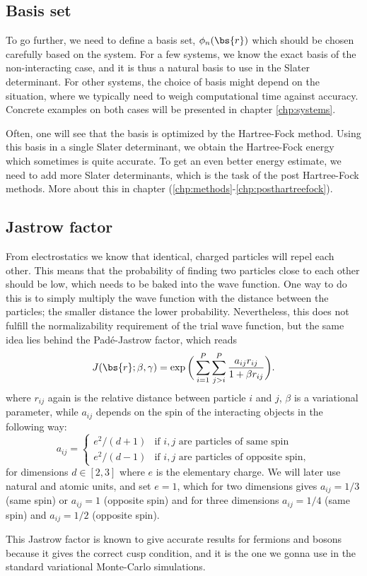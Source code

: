 \subsection{Basis set} \label{subsec:basisset}
To go further, we need to define a basis set, $\phi_n(\bs{r})$ which should be chosen carefully based on the system. For a few systems, we know the exact basis of the non-interacting case, and it is thus a natural basis to use in the Slater determinant. For other systems, the choice of basis might depend on the situation, where we typically need to weigh computational time against accuracy. Concrete examples on both cases will be presented in chapter \eqref{chp:systems}.

Often, one will see that the basis is optimized by the Hartree-Fock method. Using this basis in a single Slater determinant, we obtain the Hartree-Fock energy which sometimes is quite accurate. To get an even better energy estimate, we need to add more Slater determinants, which is the task of the post Hartree-Fock methods. More about this in chapter (\ref{chp:methods}-\ref{chp:posthartreefock}).

\subsection{Jastrow factor} \label{subsubsec:jastrow}
From electrostatics we know that identical, charged particles will repel each other. This means that the probability of finding two particles close to each other should be low, which needs to be baked into the wave function. One way to do this is to simply multiply the wave function with the distance between the particles; the smaller distance the lower probability. Nevertheless, this does not fulfill the normalizability requirement of the trial wave function, but the same idea lies behind the Padé-Jastrow factor, which reads
\begin{equation}
J(\bs{r}; \beta, \gamma) = \exp\bigg(\sum_{i=1}^P\sum_{j>i}^P\frac{a_{ij}r_{ij}}{1+\beta r_{ij}}\bigg).
\label{eq:PadeJastrow}
\end{equation}
where $r_{ij}$ again is the relative distance between particle $i$ and $j$, $\beta$ is a variational parameter, while $a_{ij}$ depends on the spin of the interacting objects in the following way:
\begin{equation}
\label{eq:ajastrow}
a_{ij}=
\begin{cases} 
e^2/(d+1) & \text{if $i,j$ are particles of same spin} \\
e^2/(d-1) & \text{if $i,j$ are particles of opposite spin},
\end{cases}
\end{equation}
for dimensions $d\in[2,3]$ where $e$ is the elementary charge. We will later use natural and atomic units, and set $e=1$, which for two dimensions gives $a_{ij}=1/3$ (same spin) or $a_{ij}=1$ (opposite spin) and for three dimensions $a_{ij}=1/4$ (same spin) and $a_{ij}=1/2$ (opposite spin).

This Jastrow factor is known to give accurate results for fermions and bosons because it gives the correct cusp condition, and it is the one we gonna use in the standard variational Monte-Carlo simulations.





